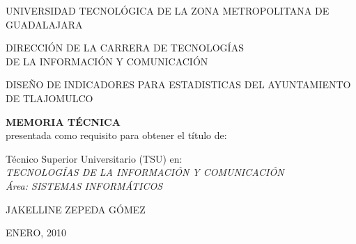 \documentclass[12pt,spanish]{report}
\begin{document}
\begin{center}
\LARGE{UNIVERSIDAD TECNOL\'OGICA DE LA ZONA METROPOLITANA DE GUADALAJARA}\\
\end{center}

\vspace{0.05in}

\begin{center}
\large{DIRECCI\'ON DE LA CARRERA DE TECNOLOG\'IAS\\ DE LA INFORMACI\'ON Y COMUNICACI\'ON}\\
\end{center}

\vspace{0.1in}

\par
\centerline{\hbox{}}
\par

\vspace{0.1in}

\begin{center}
\LARGE{DISE\~NO DE INDICADORES PARA ESTADISTICAS DEL AYUNTAMIENTO DE TLAJOMULCO}\\
\end{center}

\vspace{0.1in}

\begin{center}
{\bfseries{MEMORIA T\'ECNICA}}\\
presentada como requisito para obtener el t\'itulo de:
\end{center}

\begin{center}
\large{T\'ecnico Superior Universitario (TSU) en: \\
\emph{TECNOLOG\'IAS DE LA INFORMACI\'ON Y COMUNICACI\'ON \\
\'Area: SISTEMAS INFORM\'ATICOS}}\\
\end{center}

\vspace{0.1in}

\begin{center}
\Large{JAKELLINE ZEPEDA G\'OMEZ}\\
\end{center}

\vspace{0.5in}

\begin{center}
{ENERO, 2010}
\end{center}

\end{document}
